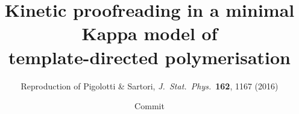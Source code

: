 \documentclass[11pt]{article}
\title{\vspace{-2.2em}Kinetic proofreading in a minimal Kappa model of\\
template-directed polymerisation}
\author{Reproduction of Pigolotti \& Sartori, \emph{J.\ Stat.\ Phys.}\ \textbf{162}, 1167 (2016)}
\date{Commit \texttt{\githash}}
\begin{document}
\maketitle
\vspace{-1.5em}
\begin{abstract}\noindent

\end{abstract}


\end{document}

